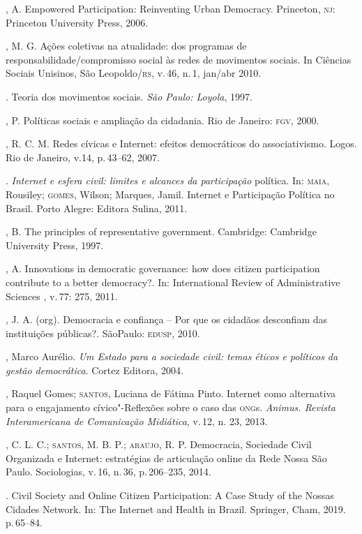 \begin{bibliohedra}
, A. Empowered Participation: Reinventing Urban Democracy.
Princeton, \textsc{nj}: Princeton University Press, 2006.

, M. G. Ações coletivas na atualidade: dos programas de
responsabilidade/compromisso social às redes de movimentos sociais. In
Ciências Sociais Unisinos, São Leopoldo/\textsc{rs}, v.\,46, n.\,1, jan/abr 2010.

\titidem. Teoria dos movimentos sociais. \emph{São Paulo:
Loyola}, 1997.

, P. Políticas sociais e ampliação da cidadania. Rio de Janeiro:
\textsc{fgv}, 2000.

, R. C. M. Redes cívicas e Internet: efeitos democráticos do
associativismo. Logos. Rio de Janeiro, v.14, p.\,43--62, 2007.

\titidem. \emph{Internet e esfera civil: limites e alcances da
participação} política. In: \textsc{maia}, Rousiley; \textsc{gomes}, Wilson; Marques,
Jamil. Internet e Participação Política no Brasil. Porto Alegre: Editora
Sulina, 2011.

, B. The principles of representative government. Cambridge:
Cambridge University Press, 1997.

, A. Innovations in democratic governance: how does citizen
participation contribute to a better democracy?. In: International
Review of Administrative Sciences , v.\,77: 275, 2011.

, J. A. (org). Democracia e confiança -- Por que os cidadãos
desconfiam das instituições públicas?. SãoPaulo: \textsc{edusp}, 2010.

, Marco Aurélio. \emph{Um Estado para a sociedade civil: temas
éticos e políticos da gestão democrática}. Cortez Editora, 2004.

, Raquel Gomes; \textsc{santos}, Luciana de Fátima Pinto. Internet como
alternativa para o engajamento cívico"-Reflexões sobre o caso das \textsc{ong}s.
\emph{Animus. Revista Interamericana de Comunicação Midiática}, v.\,12,
n. 23, 2013.

, C. L. C.; \textsc{santos}, M. B. P.; \textsc{araújo}, R. P. Democracia,
Sociedade Civil Organizada e Internet: estratégias de articulação online
da Rede Nossa São Paulo. Sociologias, v.\,16, n.\,36, p.\,206--235, 2014.

\titidem. Civil Society and Online Citizen Participation:
A Case Study of the Nossas Cidades Network. In: The Internet and Health
in Brazil. Springer, Cham, 2019. p.\,65--84.


\end{bibliohedra}
